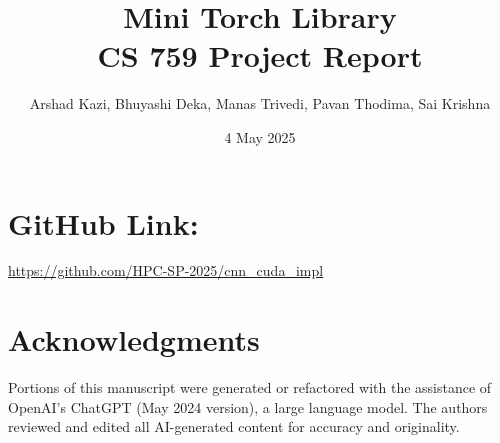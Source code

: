 \documentclass{article}
\title{Mini Torch Library\\CS 759 Project Report}
\author{Arshad Kazi, Bhuyashi Deka, Manas Trivedi, Pavan Thodima, Sai Krishna}
\date{4 May 2025}
\begin{document}
\maketitle

\section*{GitHub Link:} \url{https://github.com/HPC-SP-2025/cnn_cuda_impl}











\section*{Acknowledgments}
Portions of this manuscript were generated or refactored with the assistance of OpenAI's ChatGPT (May 2024 version), a large language model. The authors reviewed and edited all AI-generated content for accuracy and originality.

\printbibliography



\end{document}
